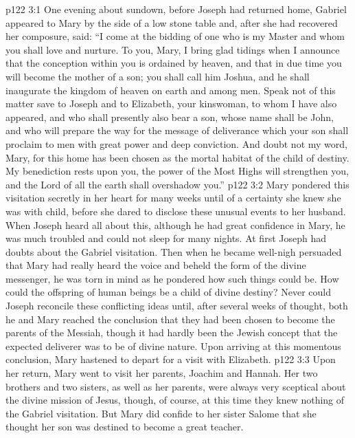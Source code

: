 \vs p122 3:1 One evening about sundown, before Joseph had returned home, Gabriel appeared to Mary by the side of a low stone table and, after she had recovered her composure, said: “I come at the bidding of one who is my Master and whom you shall love and nurture. To you, Mary, I bring glad tidings when I announce that the conception within you is ordained by heaven, and that in due time you will become the mother of a son; you shall call him Joshua, and he shall inaugurate the kingdom of heaven on earth and among men. Speak not of this matter save to Joseph and to Elizabeth, your kinswoman, to whom I have also appeared, and who shall presently also bear a son, whose name shall be John, and who will prepare the way for the message of deliverance which your son shall proclaim to men with great power and deep conviction. And doubt not my word, Mary, for this home has been chosen as the mortal habitat of the child of destiny. My benediction rests upon you, the power of the Most Highs will strengthen you, and the Lord of all the earth shall overshadow you.”
\vs p122 3:2 \pc Mary pondered this visitation secretly in her heart for many weeks until of a certainty she knew she was with child, before she dared to disclose these unusual events to her husband. When Joseph heard all about this, although he had great confidence in Mary, he was much troubled and could not sleep for many nights. At first Joseph had doubts about the Gabriel visitation. Then when he became well\hyp{}nigh persuaded that Mary had really heard the voice and beheld the form of the divine messenger, he was torn in mind as he pondered how such things could be. How could the offspring of human beings be a child of divine destiny? Never could Joseph reconcile these conflicting ideas until, after several weeks of thought, both he and Mary reached the conclusion that they had been chosen to become the parents of the Messiah, though it had hardly been the Jewish concept that the expected deliverer was to be of divine nature. Upon arriving at this momentous conclusion, Mary hastened to depart for a visit with Elizabeth.
\vs p122 3:3 Upon her return, Mary went to visit her parents, Joachim and Hannah. Her two brothers and two sisters, as well as her parents, were always very sceptical about the divine mission of Jesus, though, of course, at this time they knew nothing of the Gabriel visitation. But Mary did confide to her sister Salome that she thought her son was destined to become a great teacher.
